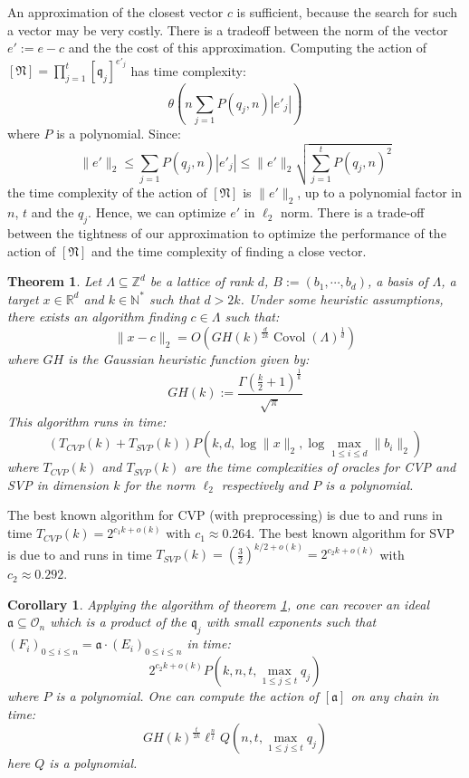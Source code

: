 \documentclass[a4paper,10pt]{report}
\theoremstyle{definition}
\theoremstyle{plain}
\newtheorem{corollary}[definition]{Corollary}
\newtheorem{theorem}[definition]{Theorem}
\theoremstyle{definition}
\newcommand{\N}{\mathbb{N}}
\newcommand{\Z}{\mathbb{Z}}
\newcommand{\R}{\mathbb{R}}
\newcommand{\mO}{\mathcal{O}}
\renewcommand{\(}{\left(}
\renewcommand{\)}{\right)}
\newcommand{\mf}[1]{\mathfrak{#1}}
\DeclareMathOperator{\Covol}{Covol}
\begin{document}
An approximation of the closest vector $c$ is sufficient, because the search for such a vector may be very costly. There is a tradeoff between the norm of the vector $e':=e-c$ and the the cost of this approximation. Computing the action of $[\mf{N}]=\prod_{j=1}^t[\mf{q}_j]^{e'_j}$ has time complexity:
\[\theta\(n\sum_{j=1}P(q_j,n)|e'_j|\)\]
where $P$ is a polynomial. Since:
\[\|e'\|_2\leq \sum_{j=1}P(q_j,n)|e'_j|\leq \|e'\|_2\sqrt{\sum_{j=1}^tP(q_j,n)^2}\]
the time complexity of the action of $[\mf{N}]$ is $\|e'\|_2$, up to a polynomial factor in $n$, $t$ and the $q_j$. Hence, we can optimize $e'$ in $\ell_2$ norm. There is a trade-off between the tightness of our approximation to optimize the performance of  the action of $[\mf{N}]$ and the time complexity of finding a close vector.

\begin{theorem}\cite[theorem 3.3]{Espitau2020}\label{theorem 7}
Let $\Lambda\subseteq\Z^d$ be a lattice of rank $d$, $B:=(b_1,\cdots, b_d)$,  a basis of $\Lambda$, a target $x\in\R^d$ and $k\in\N^*$ such that $d>2k$. Under some heuristic assumptions, there exists an algorithm finding $c\in\Lambda$ such that:
\[\|x-c\|_2=O\(GH(k)^{\frac{d}{2k}}\Covol(\Lambda)^{\frac{1}{d}}\)\]
where $GH$ is the Gaussian heuristic function given by:
\[GH(k):=\frac{\Gamma\(\frac{k}{2}+1\)^{\frac{1}{k}}}{\sqrt{\pi}}\]
This algorithm runs in time:
\[(T_{CVP}(k)+T_{SVP}(k))P\(k,d,\log\|x\|_2,\log\max_{1\leq i\leq d}\|b_i\|_2\)\]
where $T_{CVP}(k)$ and $T_{SVP}(k)$ are the time complexities of oracles  for CVP and SVP in dimension $k$ for the norm $\ell_2$ respectively and $P$ is a polynomial.
\end{theorem}

The best known algorithm for CVP (with preprocessing) is due to \cite{Ducas2020} and runs in time $T_{CVP}(k)=2^{c_1 k+o(k)}$ with $c_1\approx 0.264$. The best known algorithm for SVP is due to \cite{Ducas2016} and runs in time $T_{SVP}(k)=\(\frac{3}{2}\)^{k/2+o(k)}=2^{c_2 k+o(k)}$ with $c_2\approx 0.292$.

\begin{corollary}\label{corollary 1}
Applying the algorithm of theorem \ref{theorem 7}, one can recover an ideal $\mf{a}\subseteq \mO_n$ which is a product of the $\mf{q}_j$ with small exponents such that $(F_i)_{0\leq i\leq n}=\mf{a}\cdot (E_i)_{0\leq i\leq n}$ in time: 
\[2^{c_2k+o(k)}P(k,n,t,\max_{1\leq j\leq t}q_j)\]
where $P$ is a polynomial.  One can compute the action of $[\mf{a}]$ on any chain in time: 
\[GH(k)^{\frac{t}{2k}}\ell^{\frac{n}{t}}Q(n,t,\max_{1\leq j\leq t}q_j)\] 
here $Q$ is a polynomial.
\end{corollary} 
\end{document}
